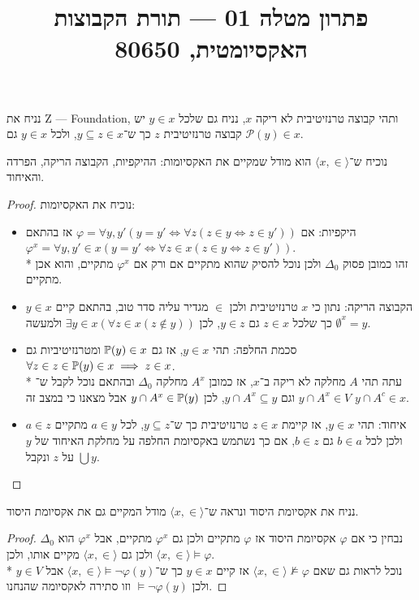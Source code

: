 
\title{פתרון מטלה 01 --- תורת הקבוצות האקסיומטית, 80650}


\maketitle
\maketitleprint{}

\Question{}
נניח את Z --- Foundation, ותהי קבוצה טרנזיטיבית לא ריקה $x$, נניח גם שלכל $y \in x$ יש קבוצה טרנזיטיבית $z$ כך ש־$y \subseteq z \in x$, ולכל $y \in x$ גם $\mathcal{P}(y) \in x$.

\Subquestion{}
נוכיח ש־$\langle x, \in \rangle$ הוא מודל שמקיים את האקסיומות: ההיקפיות, הקבוצה הריקה, הפרדה והאיחוד.
\begin{proof}
	נוכיח את האקסיומות:
	\begin{itemize}
		\item היקפיות:
			אם $\varphi = \forall y, y' (y = y' \iff \forall z(z \in y \iff z \in y'))$ אז בהתאם $\varphi^x = \forall y, y' \in x (y = y' \iff \forall z \in x (z \in y \iff z \in y'))$. \\*
			זהו כמובן פסוק $\Delta_0$ ולכן נוכל להסיק שהוא מתקיים אם ורק אם $\varphi^x$ מתקיים, והוא אכן מתקיים.
		\item הקבוצה הריקה:
			נתון כי $x$ טרנזיטיבית ולכן $\in$ מגדיר עליה סדר טוב, בהתאם קיים $y \in x$ כך שלכל $z \in x$ גם $y \in z$, לכן $\exists y \in x (\forall z \in x (z \notin y))$ ולמעשה $\emptyset^x = y$.
		\item סכמת החלפה: תהי $y \in x$, אז גם $\mathbb{P}(y) \in x$ ומטרנזיטיביות גם $\forall z \in z \in \mathbb{P}(y) \in x \implies z \in x$. \\*
			עתה תהי $A$ מחלקה לא ריקה ב־$x$, אז כמובן $A^x$ מחלקה $\Delta_0$ ובהתאם נוכל לקבל ש־$y \cap A^x \in V$ וגם $y \cap A^x \subseteq y$, לכן $y \cap A^x \in \mathbb{P}(y)$ אבל מצאנו כי במצב זה $y \cap A^c \in x$.
		\item איחוד:
			תהי $y \in x$, אז קיימת $z \in x$ טרנזיטיבית כך ש־$y \subseteq z$, לכל $a \in y$ מתקיים $a \in z$ ולכן לכל $b \in a$ גם $b \in z$, אם כך נשתמש באקסיומת החלפה על מחלקת האיחוד של $y$ על $z$ ונקבל $\bigcup y$.
	\end{itemize}
\end{proof}

\Question{}
נניח את אקסיומת היסוד ונראה ש־$\langle x, \in \rangle$ מודל המקיים גם את אקסיומת היסוד.
\begin{proof}
	נבחין כי אם $\varphi$ אקסיומת היסוד אז $\varphi$ מתקיים ולכן גם $\varphi^x$ מתקיים, אבל $\varphi^x$ הוא $\Delta_0$ ולכן גם $\langle x, \in \rangle$ מקיים אותו, ולכן $\langle x, \in \rangle \models \varphi$. \\*
	נוכל לראות גם שאם $\langle x, \in \rangle \not\models \varphi$ אז קיים $y \in x$ כך ש־$\langle x, \in \rangle \models \lnot \varphi(y)$ אבל $y \in V$ ולכן $\models \lnot \varphi(y)$ וזו סתירה לאקסיומה שהנחנו.
\end{proof}

